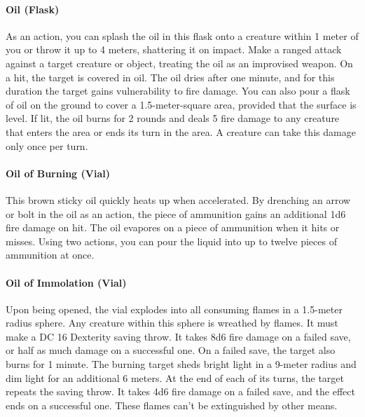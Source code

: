     \paragraph{Oil (Flask)}
        As an action, you can splash the oil in this flask onto a creature within 1 meter of you or throw it up to 4 meters, shattering it on impact.
        Make a ranged attack against a target creature or object, treating the oil as an improvised weapon.
        On a hit, the target is covered in oil.
        The oil dries after one minute, and for this duration the target gains vulnerability to fire damage.
        You can also pour a flask of oil on the ground to cover a 1.5-meter-square area, provided that the surface is level.
        If lit, the oil burns for 2 rounds and deals 5 fire damage to any creature that enters the area or ends its turn in the area.
        A creature can take this damage only once per turn.
    \paragraph{Oil of Burning (Vial)} %
        This brown sticky oil quickly heats up when accelerated.
        By drenching an arrow or bolt in the oil as an action, the piece of ammunition gains an additional 1d6 fire damage on hit.
        The oil evapores on a piece of ammunition when it hits or misses.
        Using two actions, you can pour the liquid into up to twelve pieces of ammunition at once.
    \paragraph{Oil of Immolation (Vial)} %
        Upon being opened, the vial explodes into all consuming flames in a 1.5-meter radius sphere.
        Any creature within this sphere is wreathed by flames.
        It must make a DC 16 Dexterity saving throw.
        It takes 8d6 fire damage on a failed save, or half as much damage on a successful one.
        On a failed save, the target also burns for 1 minute.
        The burning target sheds bright light in a 9-meter radius and dim light for an additional 6 meters.
        At the end of each of its turns, the target repeats the saving throw.
        It takes 4d6 fire damage on a failed save, and the effect ends on a successful one.
        These flames can't be extinguished by other means.

